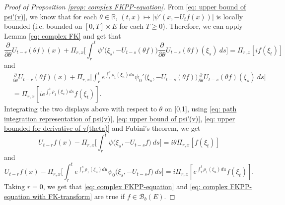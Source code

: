 \documentclass[12pt,a4paper]{amsart}
\theoremstyle{plain}
\theoremstyle{definition}
\numberwithin{equation}{section}
\begin{document}
\begin{proof}[Proof of Proposition \ref{prop: complex FKPP-equation}]
    From \eqref{eq: upper bound of psi'(v)}, we know that for each $\theta\in \mathbb R$, $(t,x) \mapsto |\psi'(x,-U_tf(x))|$ is locally bounded (i.e. bounded on $[0,T]\times E$ for each $T \geq 0$).
    Therefore, we can apply Lemma \ref{eq: complex FK} and get that
\[
    \frac{\partial}{\partial \theta} U_{t-r}(\theta f)(x) + \Pi_{r,x} \Big[\int_r^t \psi'\big(\xi_s,- U_{t-s}(\theta f)\big)\frac{\partial}{\partial \theta} U_{t-s}(\theta f)(\xi_s)~ds\Big]
    = \Pi_{r,x} [i f(\xi_t)]
\]
    and
\begin{align}
    &\frac{\partial}{\partial \theta} U_{t-r}(\theta f)(x) + \Pi_{r,x} \Big[\int_r^t e^{\int_r^s \rho_1(\xi_u)du}\psi_0'\big(\xi_s,- U_{t-s}(\theta f)\big)\frac{\partial}{\partial \theta} U_{t-s}(\theta f)(\xi_s)~ds\Big]\\
    &= \Pi_{r,x} [i e^{\int_r^t \rho_1(\xi_s)ds}f(\xi_t)].
\end{align}
    Integrating the two displays above with respect to $\theta$  on [0,1], using \eqref{eq: path integration representation of psi(v)}, \eqref{eq: upper bound of psi'(v)}, \eqref{eq: upper bounded for derivative of v(theta)} and Fubini's theorem, we get
\begin{equation}
    U_{t-r}f(x) - \Pi_{r,x} \Big[\int_r^t \psi\big(\xi_s,-U_{t-s}f\big) ~ds\Big]
    = i\theta \Pi_{r,x} [f(\xi_t)]
\end{equation}
    and
\begin{equation}
    U_{t-r}f(x) - \Pi_{r,x} \Big[\int_r^t e^{\int_r^s \rho_1(\xi_u)du} \psi_0\big(\xi_s,- U_{t-s}f\big) ~ds\Big]
    = i\Pi_{r,x} [e^{\int_r^t\rho_1(\xi_u)du}f(\xi_t)].
\end{equation}
    Taking $r = 0$, we get that \eqref{eq: complex FKPP-equation} and \eqref{eq: complex FKPP-equation with FK-transform} are true if $f\in \mathcal B_b(E)$.


\end{proof}
\end{document}
